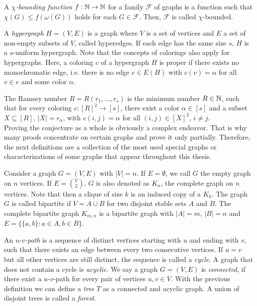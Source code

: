 \begin{defn}\label{d1}
A $\chi$\textit{-bounding function} $f:\mathbb{N}\to\mathbb{N}$ for a family $\mathcal{F}$ of graphs is a function such that $\chi (G)\leq f(\omega (G))$ holds for each $G\in\mathcal{F}$. Then, $\mathcal{F}$ is called $\chi$-bounded.
\end{defn}

A \textit{hypergraph} $H=(V,E)$ is a graph where $V$ is a set of vertices and $E$ a set of non-empty subsets of $V$, called hyperedges. If each edge has the same size $s$, $H$ is a $s$-uniform hypergraph. Note that the concepts of colorings also apply for hypergraphs. Here, a coloring $c$ of a hypergraph $H$ is proper if there exists no monochromatic edge, i.e. there is no edge $e\in E(H)$ with $c(v)=\alpha$ for all $v\in e$ and some color $\alpha$.

The Ramsey number $R=R(r_1,\dots ,r_s)$ is the minimum number $R\in\mathbb{N}$, such that for every coloring $c:[R]^2\to [s]$, there exist a color $\alpha\in [s]$ and a subset $X\subseteq [R]$, $\vert X\vert =r_{\alpha}$, with $c(i,j)=\alpha$ for all $(i,j)\in [X]^2$, $i\neq j$.\\

Proving the conjecture as a whole is obviously a complex endeavor. That is why many proofs concentrate on certain graphs and prove it only partially. Therefore, the next definitions are a collection of the most used special graphs or characterizations of some graphs that appear throughout this thesis.


Consider a graph $G=(V,E)$ with $\vert V\vert = n$. If $E=\emptyset$, we call $G$ the empty graph on $n$ vertices. If $E= {V\choose{2}}$, $G$ is also denoted as $K_n$, the complete graph on $n$ vertices. Note that then a clique of size $k$ is an induced copy of a $K_k$. The graph $G$ is called bipartite if $V=A\dot{\cup} B$ for two disjoint stable sets $A$ and $B$. The complete bipartite graph $K_{m,n}$ is a bipartite graph with $\vert A\vert =m$, $\vert B\vert =n$ and $E=\lbrace \lbrace a,b\rbrace :a\in A,b\in B\rbrace$.

An $u$-$v$\textit{-path} is a sequence of distinct vertices starting with $u$ and ending with $v$, such that there exists an edge between every two consecutive vertices. If $u=v$ but all other vertices are still distinct, the sequence is called a \textit{cycle}. A graph that does not contain a cycle is \textit{acyclic}. We say a graph $G=(V,E)$ is \textit{connected}, if there exist a $u$-$v$-path for every pair of vertices $u,v\in V$.
With the previous definition we can define a \textit{tree} $T$ as a connected and acyclic graph. A union of disjoint trees is called a \textit{forest}.

